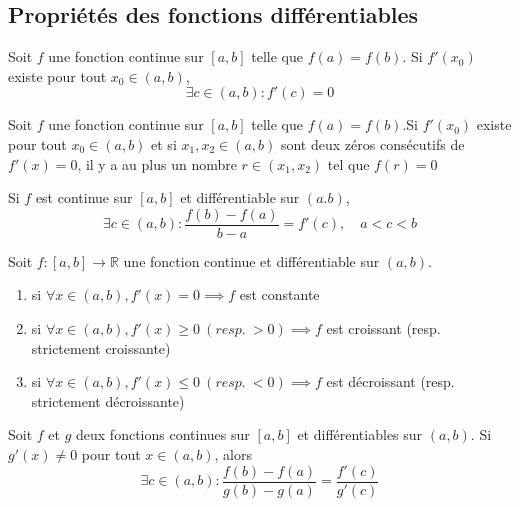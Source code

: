 	\subsection{Propriétés des fonctions différentiables}
		\begin{mythm}[Rolle]
			Soit $f$ une fonction continue sur $[a,b]$ telle que $f(a)=f(b)$. Si $f'(x_0)$ existe pour tout $x_0\in(a,b)$, \[\exists c\in (a,b) : f'(c)=0\]
		\begin{mythm}[Corollaire]
			Soit $f$ une fonction continue sur $[a,b]$ telle que $f(a)=f(b)$.Si $f'(x_0)$ existe pour tout $x_0\in (a,b)$ et si $x_1, x_2\in (a,b)$ sont deux zéros consécutifs de $f'(x)=0$, il y a au plus un nombre $r\in (x_1,x_2)$ tel que $f(r)=0$
		\end{mythm}
		\end{mythm}
		\begin{mythm}[Moyenne]
			Si $f$ est continue sur $[a,b]$ et différentiable sur $(a.b)$, \[\exists c\in (a,b) : \frac{f(b)-f(a)}{b-a}=f'(c),\quad a<c<b\]
		\end{mythm}
		\begin{mythm}
			Soit $f:[a,b]\longrightarrow\mathbb{R}$ une fonction continue et différentiable sur $(a,b)$.\begin{enumerate}[label=\alph*)]
				\item si $\forall x\in (a,b),f'(x)=0 \implies f$ est constante
				\item si $\forall x\in (a,b), f'(x)\geq 0~(resp.~ >0) \implies f$ est croissant (resp. strictement croissante)
				\item si $\forall x\in (a,b), f'(x)\leq 0~(resp.~ <0) \implies f$ est décroissant (resp. strictement décroissante)
			\end{enumerate}
		\end{mythm}
		\begin{mythm}\index{Formule de Cauchy}
			Soit $f$ et $g$ deux fonctions continues sur $[a,b]$ et différentiables sur $(a,b)$. Si $g'(x)\neq 0$ pour tout $x\in (a,b)$, alors \[\exists c\in (a,b) : \frac{f(b)-f(a)}{g(b)-g(a)}=\frac{f'(c)}{g'(c)}\]
		\end{mythm}

